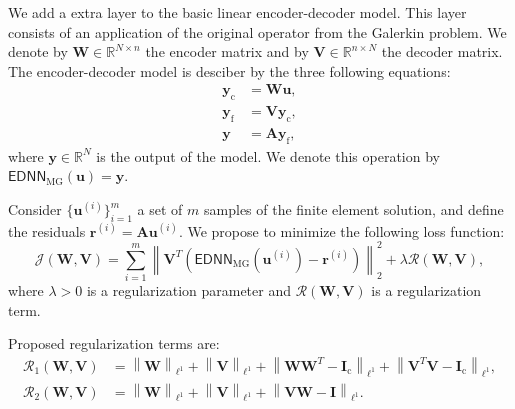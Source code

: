 We add a extra layer to the basic linear encoder-decoder model.
This layer consists of an application of the original operator from the Galerkin problem.
We denote by \(\mathbf{W} \in \mathbb{R}^{N \times n}\) the encoder matrix and by \(\mathbf{V} \in \mathbb{R}^{n \times N}\) the decoder matrix.
The encoder-decoder model is desciber by the three following equations:
\begin{subequations}
    \begin{align}
        \mathbf{y}_\mathrm{c} & = \mathbf{W} \mathbf{u}, \\
        \mathbf{y}_\mathrm{f} & = \mathbf{V} \mathbf{y}_\mathrm{c}, \\
        \mathbf{y} & = \mathbf{A} \mathbf{y}_\mathrm{f},
    \end{align}
\end{subequations}
where \(\mathbf{y} \in \mathbb{R}^{N}\) is the output of the model.
We denote this operation by \(\mathsf{EDNN}_\mathrm{MG}(\mathbf{u}) = \mathbf{y}\).

Consider \( \{ \mathbf{u}^{(i)} \}_{i=1}^{m} \) a set of \(m\) samples of the finite element solution, and define the residuals \(\mathbf{r}^{(i)} = \mathbf{A} \mathbf{u}^{(i)}\).
We propose to minimize the following loss function:
\begin{equation}
    \mathcal{J}(\mathbf{W}, \mathbf{V}) =
    \sum_{i=1}^{m} \left\lVert \mathbf{V}^T( \mathsf{EDNN}_\mathrm{MG}(\mathbf{u}^{(i)}) - \mathbf{r}^{(i)} ) \right\rVert_2^2 +
    \lambda \mathcal{R}(\mathbf{W}, \mathbf{V}),
\end{equation}
where \(\lambda > 0\) is a regularization parameter and \(\mathcal{R}(\mathbf{W}, \mathbf{V})\) is a regularization term.

Proposed regularization terms are:
\begin{subequations}
    \begin{align}
        \mathcal{R}_1(\mathbf{W}, \mathbf{V}) &
        = \left\lVert \mathbf{W} \right\rVert_{\ell^1} + \left\lVert \mathbf{V} \right\rVert_{\ell^1}
        + \left\lVert \mathbf{W} \mathbf{W}^T - \mathbf{I}_\mathrm{c} \right\rVert_{\ell^1}
        + \left\lVert \mathbf{V}^T \mathbf{V} - \mathbf{I}_\mathrm{c} \right\rVert_{\ell^1}, \\
        \mathcal{R}_2(\mathbf{W}, \mathbf{V}) &
        = \left\lVert \mathbf{W} \right\rVert_{\ell^1} + \left\lVert \mathbf{V} \right\rVert_{\ell^1}
        + \left\lVert \mathbf{V} \mathbf{W} - \mathbf{I} \right\rVert_{\ell^1}.
    \end{align}
\end{subequations}

